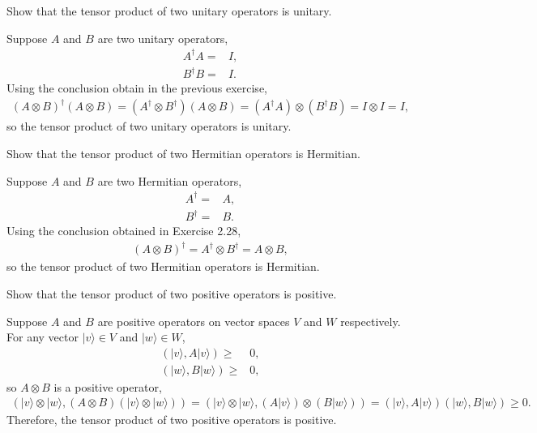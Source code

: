 \documentclass[en]{sol-man}
\begin{document}
\begin{exe}
    Show that the tensor product of two unitary operators is unitary.
\end{exe}
\begin{pf}
    Suppose $A$ and $B$ are two unitary operators,
    \begin{align}
        A^{\dagger}A=&I,\\
        B^{\dagger}B=&I.
    \end{align}
    Using the conclusion obtain in the previous exercise,
    \begin{align}
        (A\otimes B)^{\dagger}(A\otimes B)=(A^{\dagger}\otimes B^{\dagger})(A\otimes B)=(A^{\dagger}A)\otimes(B^{\dagger}B)=I\otimes I=I,
    \end{align}
    so the tensor product of two unitary operators is unitary.
\end{pf}

\begin{exe}
    Show that the tensor product of two Hermitian operators is Hermitian.
\end{exe}
\begin{pf}
    Suppose $A$ and $B$ are two Hermitian operators,
    \begin{align}
        A^{\dagger}=&A,\\
        B^{\dagger}=&B.
    \end{align}
    Using the conclusion obtained in Exercise 2.28,
    \begin{align}
        (A\otimes B)^{\dagger}=A^{\dagger}\otimes B^{\dagger}=A\otimes B,
    \end{align}
    so the tensor product of two Hermitian operators is Hermitian.
\end{pf}

\begin{exe}
    Show that the tensor product of two positive operators is positive.
\end{exe}
\begin{pf}
    Suppose $A$ and $B$ are positive operators on vector spaces $V$ and $W$ respectively. For any vector $\lvert v\rangle\in V$ and $\lvert w\rangle\in W$,
    \begin{align}
        (\lvert v\rangle,A\lvert v\rangle)\geq&0,\\
        (\lvert w\rangle,B\lvert w\rangle)\geq&0,
    \end{align}
    so $A\otimes B$ is a positive operator,
    \begin{align}
        (\lvert v\rangle\otimes\lvert w\rangle,(A\otimes B)(\lvert v\rangle\otimes\lvert w\rangle))=(\lvert v\rangle\otimes\lvert w\rangle,(A\lvert v\rangle)\otimes(B\lvert w\rangle))=(\lvert v\rangle,A\lvert v\rangle)(\lvert w\rangle,B\lvert w\rangle)\geq 0.
    \end{align}
    Therefore, the tensor product of two positive operators is positive.
\end{pf}
\end{document}
